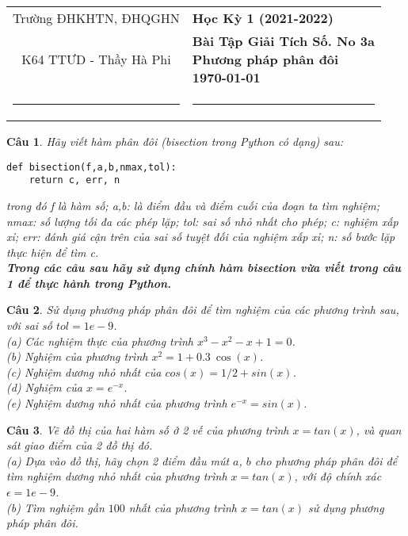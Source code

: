 \documentclass[11pt]{article}
\newtheorem{bt}{Câu}
\begin{document}
\begin{tabular*}
	{\linewidth}{c>{\centering\hspace{0pt}} p{}}
	Trường ĐHKHTN, ĐHQGHN & {\bf Học Kỳ 1 (2021-2022)}
	\tabularnewline
	K64 TTƯD - Thầy Hà Phi & {\bf Bài Tập Giải Tích Số. No 3a \\ Phương pháp phân đôi  \\ \today}
	\tabularnewline
	\rule{1in}{1pt}  \small  & \rule{2in}{1pt} %
	\tabularnewline
	
\end{tabular*}
%

\begin{bt}
Hãy viết hàm phân đôi (bisection trong Python có dạng) sau:
%
\begin{lstlisting}[frame=single] 
def bisection(f,a,b,nmax,tol):
    return c, err, n
\end{lstlisting}
%
trong đó f là hàm số; a,b: là điểm đầu và điểm cuối của đoạn ta tìm nghiệm; nmax: số lượng tối đa các phép lặp; tol: sai số nhỏ nhất cho phép; c: nghiệm xấp xỉ;
err: đánh giá cận trên của sai số tuyệt đối của nghiệm xấp xỉ; n: số bước lặp thực hiện để tìm c.\\
\textbf{Trong các câu sau hãy sử dụng chính hàm bisection vừa viết trong câu 1 để thực hành trong Python.}
\end{bt}

\begin{bt} 
Sử dụng phương pháp phân đôi để tìm nghiệm của các phương trình sau, với sai số $tol=1e-9$.\\ 
(a) Các nghiệm thực của phương trình $x^3 - x^2 - x + 1 = 0$. \\
(b) Nghiệm của phương trình $x^2 = 1 + 0.3\ \cos(x)$. \\
(c) Nghiệm dương nhỏ nhất của $cos(x) = 1/2 + sin (x)$. \\
(d) Nghiệm của $x = e^{-x}$. \\
(e) Nghiệm dương nhỏ nhất của phương trình $e^{-x} = sin(x)$. 
\end{bt}

\begin{bt}
	Vẽ đồ thị của hai hàm số ở 2 vế của phương trình $x = tan(x)$, và quan sát giao điểm của 2 đồ thị đó.\\
	(a) Dựa vào đồ thị, hãy chọn 2 điểm đầu mút $a$, $b$ cho phương pháp phân đôi để tìm nghiệm dương nhỏ nhất của phương trình $x = tan (x)$, với độ chính xác 
	$\epsilon=1e-9$. \\
	(b) Tìm nghiệm gần $100$ nhất của phương trình $x = tan(x)$ sử dụng phương pháp phân đôi.
\end{bt}
\end{document}

